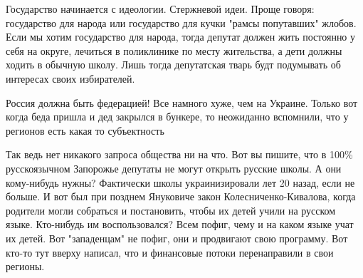 \begin{itemize}
Государство начинается с идеологии. Стержневой идеи. Проще говоря: государство
для народа или государство для кучки "рамсы попутавших" жлобов. Если мы хотим
государство для народа, тогда депутат должен жить постоянно у себя на округе,
лечиться в поликлинике по месту жительства, а дети должны ходить в обычную
школу. Лишь тогда депутатская тварь будт подумывать об интересах своих
избирателей.


Россия должна быть федерацией! Все намного хуже, чем на Украине. Только вот
когда беда пришла и дед закрылся в бункере, то неожиданно вспомнили, что у
регионов есть какая то субъектность


Так ведь нет никакого запроса общества ни на что. Вот вы пишите, что в 100\%
русскоязычном Запорожье депутаты не могут открыть русские школы. А они
кому-нибудь нужны? Фактически школы украинизировали лет 20 назад, если не
больше. И вот был при позднем Януковиче закон Колесниченко-Кивалова, когда
родители могли собраться и постановить, чтобы их детей учили на русском языке.
Кто-нибудь им воспользовался? Всем пофиг, чему и на каком языке учат их детей.
Вот "западенцам" не пофиг, они и продвигают свою программу. Вот кто-то тут
вверху написал, что и финансовые потоки перенаправили в свои регионы.

\end{itemize} %
